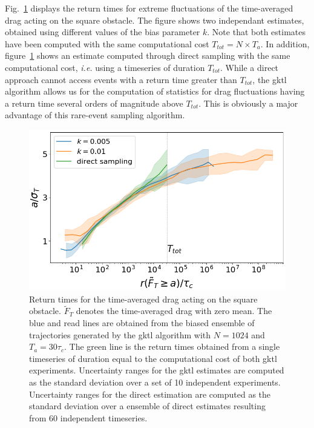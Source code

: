 \documentclass[pre,aps,floatfix,10pt,superscriptaddress, notitlepage,preprint]{revtex4-1}
\begin{document}
Fig.~\ref{fig:return_times_gktl} displays the return times for extreme fluctuations of the time-averaged drag acting on the square obstacle.
The figure shows two independant estimates, obtained using different values of the bias parameter $k$.
Note that both estimates have been computed with the same computational cost $T_{tot}=N\times T_a$.
In addition, figure~\ref{fig:return_times_gktl} shows an estimate computed through direct sampling with the same computational cost, \textit{i.e.} using a timeseries of duration $T_{tot}$.
While a direct approach cannot access events with a return time greater than $T_{tot}$, the \ac{gktl} algorithm allows us for the computation of statistics for drag fluctuations having a return time several orders of magnitude above $T_{tot}$. This is  obviously a major advantage of this rare-event sampling algorithm. 

\begin{figure}
	\centering
	\includegraphics[width=.7\linewidth]{return_times_GKTL/return_times_GKTL}
	\caption{\label{fig:return_times_gktl} Return times for the time-averaged drag acting on the square obstacle. $\tilde{F}_T$ denotes the time-averaged drag with zero mean. The blue and read lines are obtained from the biased ensemble of trajectories generated by the \ac{gktl} algorithm with $N=1024$ and $T_a=30\tau_c$. The green line is the return times obtained from a single timeseries of duration equal to the computational cost of both \ac{gktl} experiments. Uncertainty ranges for the \ac{gktl} estimates are computed as the standard deviation over a set of 10 independent experiments. Uncertainty ranges for the direct estimation are computed as the standard deviation over a ensemble of direct estimates resulting from 60 independent timeseries.}
\end{figure}
\end{document}
